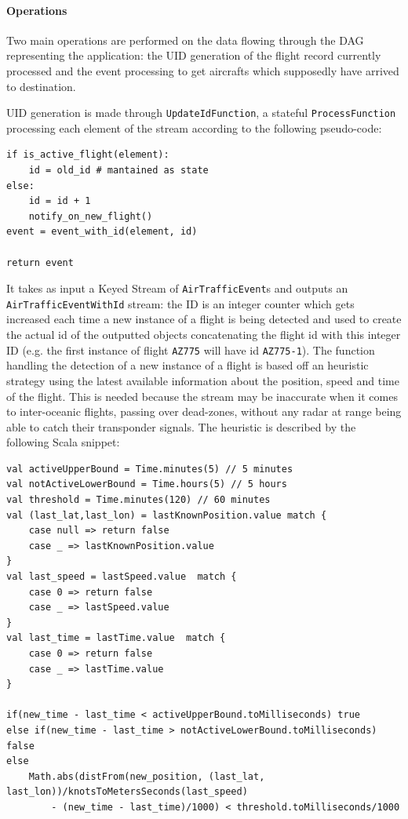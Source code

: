 \paragraph{Operations}

Two main operations are performed on the data flowing through the DAG representing the application: the UID generation of the flight record currently processed and the event processing to get aircrafts which supposedly have arrived to destination.

UID generation is made through \texttt{UpdateIdFunction}, a stateful \texttt{ProcessFunction} processing each element of the stream according to the following pseudo-code:

\begin{verbatim}
if is_active_flight(element):
    id = old_id # mantained as state
else:
    id = id + 1
    notify_on_new_flight()
event = event_with_id(element, id)

return event
\end{verbatim}

It takes as input a Keyed Stream of \texttt{AirTrafficEvent}s and outputs an \texttt{AirTrafficEventWithId} stream: the ID is an integer counter which gets increased each time a new instance of a flight is being detected and used to create the actual id of the outputted objects concatenating the flight id with this integer ID (e.g. the first instance of flight \texttt{AZ775} will have id \texttt{AZ775-1}). The function handling the detection of a new instance of a flight is based off an heuristic strategy using the latest available information about the position, speed and time of the flight. This is needed because the stream may be inaccurate when it comes to inter-oceanic flights, passing over dead-zones, without any radar at range being able to catch their transponder signals. The heuristic is described by the following Scala snippet:

\begin{verbatim}
val activeUpperBound = Time.minutes(5) // 5 minutes
val notActiveLowerBound = Time.hours(5) // 5 hours
val threshold = Time.minutes(120) // 60 minutes
val (last_lat,last_lon) = lastKnownPosition.value match {
    case null => return false
    case _ => lastKnownPosition.value
}
val last_speed = lastSpeed.value  match {
    case 0 => return false
    case _ => lastSpeed.value
}
val last_time = lastTime.value  match {
    case 0 => return false
    case _ => lastTime.value
}

if(new_time - last_time < activeUpperBound.toMilliseconds) true
else if(new_time - last_time > notActiveLowerBound.toMilliseconds) false
else
    Math.abs(distFrom(new_position, (last_lat, last_lon))/knotsToMetersSeconds(last_speed)
        - (new_time - last_time)/1000) < threshold.toMilliseconds/1000

\end{verbatim}

